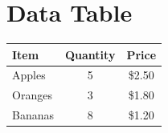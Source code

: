 \documentclass{article}
\begin{document}
\section{Data Table}

\begin{tabular}{lcc}
\hline
Item & Quantity & Price \\
\hline
Apples & 5 & \$2.50 \\
Oranges & 3 & \$1.80 \\
Bananas & 8 & \$1.20 \\
\hline
\end{tabular}
\end{document}
